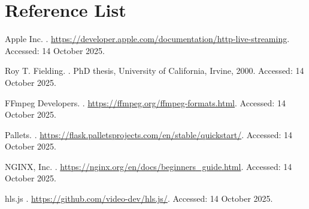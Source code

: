 \documentclass[11pt]{article}
\begin{document}
\section{Reference List}

\begin{thebibliography}{9}

Apple Inc.
.
\newblock \url{https://developer.apple.com/documentation/http-live-streaming}.
\newblock Accessed: 14 October 2025.

Roy T. Fielding.
.
\newblock PhD thesis, University of California, Irvine, 2000.
\newblock Accessed: 14 October 2025.

FFmpeg Developers.
.
\newblock \url{https://ffmpeg.org/ffmpeg-formats.html}.
\newblock Accessed: 14 October 2025.

Pallets.
.
\newblock \url{https://flask.palletsprojects.com/en/stable/quickstart/}.
\newblock Accessed: 14 October 2025.

NGINX, Inc.
.
\newblock \url{https://nginx.org/en/docs/beginners_guide.html}.
\newblock Accessed: 14 October 2025.

hls.js
.
\newblock \url{https://github.com/video-dev/hls.js/}.
\newblock Accessed: 14 October 2025.

\end{thebibliography}
\end{document}
